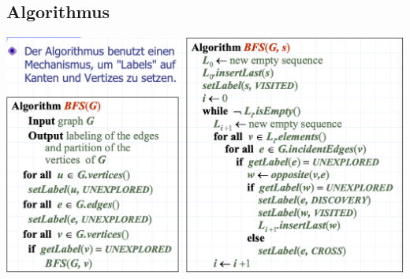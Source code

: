 \subsection{Algorithmus}
\begin{center}
    \includegraphics[scale=.25]{graphic/13 BFS/Algorithmus.png}
\end{center}
\vspace{-8pt}




